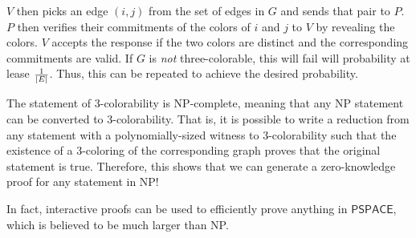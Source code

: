 $V$ then picks an edge $(i, j)$ from the set of edges in $G$ and sends that pair to $P$. $P$ then verifies their commitments of the colors of $i$ and $j$ to $V$ by revealing the colors. $V$ accepts the response if the two colors are distinct and the corresponding commitments are valid. If $G$ is \emph{not} three-colorable, this will fail will probability at lease $\frac{1}{\left| E \right|}$. Thus, this can be repeated to achieve the desired probability.

The statement of 3-colorability is NP-complete, meaning that any NP statement can be converted to 3-colorability. That is, it is possible to write a reduction from any statement with a polynomially-sized witness to 3-colorability such that the existence of a 3-coloring of the corresponding graph proves that the original statement is true. Therefore, this shows that we can generate a zero-knowledge proof for any statement in NP!

In fact, interactive proofs can be used to efficiently prove anything in $\mathsf{PSPACE}$, which is believed to be much larger than NP.
